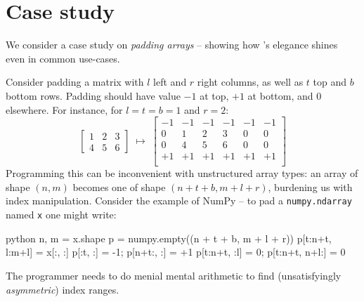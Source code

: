 \section{Case study}

We consider a case study on \emph{padding arrays} -- showing how \starr{}'s elegance shines even in common use-cases.

Consider padding a matrix with $l$ left and $r$ right columns, as well as $t$ top and $b$ bottom rows. Padding should have value $-1$ at top, $+1$ at bottom, and $0$ elsewhere. For instance, for $l = t = b = 1$ and $r = 2$:
$$ \begin{bmatrix}
    1 & 2 & 3 \\ 4 & 5 & 6
\end{bmatrix} \;\mapsto\; \begin{bmatrix}
    -1 & -1 & -1 & -1 & -1 & -1 \\
    0 & 1 & 2 & 3 & 0 & 0 \\
    0 & 4 & 5 & 6 & 0 & 0 \\
    +1 & +1 & +1 & +1 & +1 & +1 \\
\end{bmatrix} $$
Programming this can be inconvenient with unstructured array types: an array of shape $(n, m)$ becomes one of shape $(n + t + b, m + l + r)$, burdening us with index manipulation. Consider the example of NumPy -- to pad a \texttt{numpy.ndarray} named \texttt{x} one might write:
\begin{center}
\begin{cminted}{python}
   n, m = x.shape
   p = numpy.empty((n + t + b, m + l + r))
   p[t:n+t, l:m+l] = x[:, :]
   p[:t, :] = -1;    p[n+t:, :] = +1
   p[t:n+t, :l] = 0; p[t:n+t, n+l:] = 0
\end{cminted}    
\end{center}
The programmer needs to do menial mental arithmetic to find (unsatisfyingly \emph{asymmetric}) index ranges.

